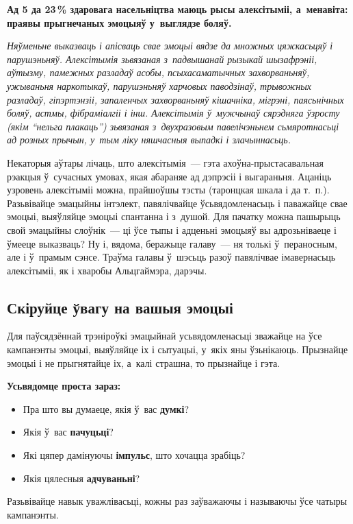 \textbf{Ад 5 да 23\,\% здаровага насельніцтва маюць рысы алексітыміі, а~менавіта: праявы прыгнечаных эмоцыяў у~выглядзе боляў.}

\emph{Няўменьне выказваць і апісваць свае эмоцыі вядзе да множных цяжкасьцяў і парушэньняў. Алексітымія зьвязаная з~падвышанай рызыкай шызафрэніі, аўтызму, памежных разладаў асобы, псыхасаматычных захворваньняў, ужываньня наркотыкаў, парушэньняў харчовых паводзінаў, трывожных разладаў, гіпэртэнзіі, запаленчых захворваньняў кішачніка, мігрэні, паясьнічных боляў, астмы, фібраміалгіі і інш. Алексітымія ў~мужчынаў сярэдняга ўзросту (якім ``нельга плакаць'') зьвязаная з~двухразовым павелічэньнем сьмяротнасьці ад розных прычын, у~тым ліку няшчасныя выпадкі і злачыннасьць.}

Некаторыя аўтары лічаць, што алексітымія~--- гэта ахоўна-прыстасавальная рэакцыя ў~сучасных умовах, якая абараняе ад дэпрэсіі і выгараньня. Ацаніць узровень алексітыміі можна, прайшоўшы тэсты (таронцкая шкала і да т.~п.). Разьвівайце эмацыйны інтэлект, павялічвайце ўсьвядомленасьць і паважайце свае эмоцыі, выяўляйце эмоцыі спантанна і з~душой. Для пачатку можна пашырыць свой эмацыйны слоўнік~--- ці ўсе тыпы і адценьні эмоцыяў вы адрозьніваеце і ўмееце выказваць? Ну і, вядома, беражыце галаву~--- ня толькі ў~пераносным, але і ў~прамым сэнсе. Траўма галавы ў~шэсьць разоў павялічвае імавернасьць алексітыміі, як і хваробы Альцгаймэра, дарэчы.

\subsection*{Скіруйце ўвагу на вашыя эмоцыі}

Для паўсядзённай трэніроўкі эмацыйнай усьвядомленасьці зважайце на ўсе кампанэнты эмоцыі, выяўляйце іх і сытуацыі, у~якіх яны ўзьнікаюць. Прызнайце эмоцыі і не прыгнятайце іх, а~калі страшна, то прызнайце і гэта.

\textbf{Усьвядомце проста зараз:} 
\begin{itemize}
  \item Пра што вы думаеце, якія ў~вас \textbf{думкі}?
  \item Якія ў~вас \textbf{пачуцьці}?
  \item Які цяпер дамінуючы \textbf{імпульс}, што хочацца зрабіць?
  \item Якія цялесныя \textbf{адчуваньні}?
\end{itemize}

Разьвівайце навык уважлівасьці, кожны раз заўважаючы і называючы ўсе чатыры кампанэнты.

